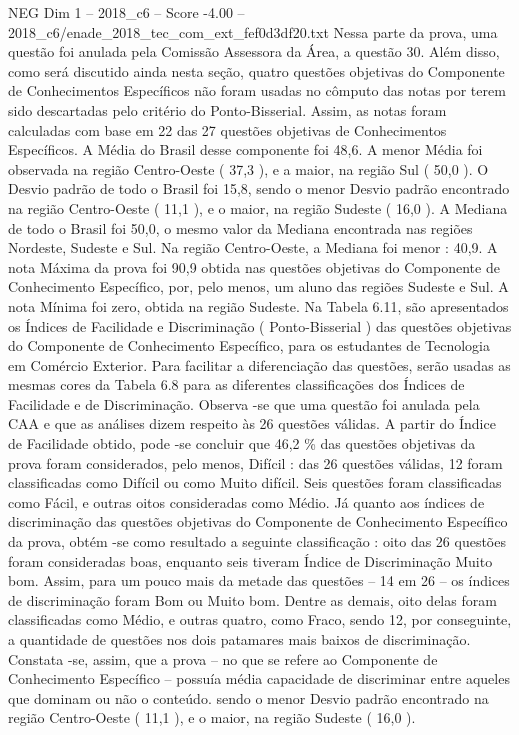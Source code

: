 \begin{textsample}{NEG Dim 1 – 2018\_c6 – Score -4.00 – 2018\_c6/enade\_2018\_tec\_com\_ext\_fef0d3df20.txt}
Nessa parte da prova, uma questão foi anulada pela Comissão Assessora da Área, a questão 30.
Além disso, como será discutido ainda nesta seção, quatro questões objetivas do Componente de Conhecimentos Específicos não foram usadas no cômputo das notas por terem sido descartadas pelo critério do Ponto-Bisserial.
Assim, as notas foram calculadas com base em 22 das 27 questões objetivas de Conhecimentos Específicos.
A Média do Brasil desse componente foi 48,6.
A menor Média foi observada na região Centro-Oeste ( 37,3 ), e a maior, na região Sul ( 50,0 ).
O Desvio padrão de todo o Brasil foi 15,8, sendo o menor Desvio padrão encontrado na região Centro-Oeste ( 11,1 ), e o maior, na região Sudeste ( 16,0 ).
A Mediana de todo o Brasil foi 50,0, o mesmo valor da Mediana encontrada nas regiões Nordeste, Sudeste e Sul.
Na região Centro-Oeste, a Mediana foi menor : 40,9.
A nota Máxima da prova foi 90,9 obtida nas questões objetivas do Componente de Conhecimento Específico, por, pelo menos, um aluno das regiões Sudeste e Sul.
A nota Mínima foi zero, obtida na região Sudeste.
Na Tabela 6.11, são apresentados os Índices de Facilidade e Discriminação ( Ponto-Bisserial ) das questões objetivas do Componente de Conhecimento Específico, para os estudantes de Tecnologia em Comércio Exterior.
Para facilitar a diferenciação das questões, serão usadas as mesmas cores da Tabela 6.8 para as diferentes classificações dos Índices de Facilidade e de Discriminação.
Observa -se que uma questão foi anulada pela CAA e que as análises dizem respeito às 26 questões válidas.
A partir do Índice de Facilidade obtido, pode -se concluir que 46,2 \% das questões objetivas da prova foram considerados, pelo menos, Difícil : das 26 questões válidas, 12 foram classificadas como Difícil ou como Muito difícil.
Seis questões foram classificadas como Fácil, e outras oitos consideradas como Médio.
Já quanto aos índices de discriminação das questões objetivas do Componente de Conhecimento Específico da prova, obtém -se como resultado a seguinte classificação : oito das 26 questões foram consideradas boas, enquanto seis tiveram Índice de Discriminação Muito bom.
Assim, para um pouco mais da metade das questões – 14 em 26 – os índices de discriminação foram Bom ou Muito bom.
Dentre as demais, oito delas foram classificadas como Médio, e outras quatro, como Fraco, sendo 12, por conseguinte, a quantidade de questões nos dois patamares mais baixos de discriminação.
Constata -se, assim, que a prova – no que se refere ao Componente de Conhecimento Específico – possuía média capacidade de discriminar entre aqueles que dominam ou não o conteúdo. sendo o menor Desvio padrão encontrado na região Centro-Oeste ( 11,1 ), e o maior, na região Sudeste ( 16,0 ).

\end{textsample}
